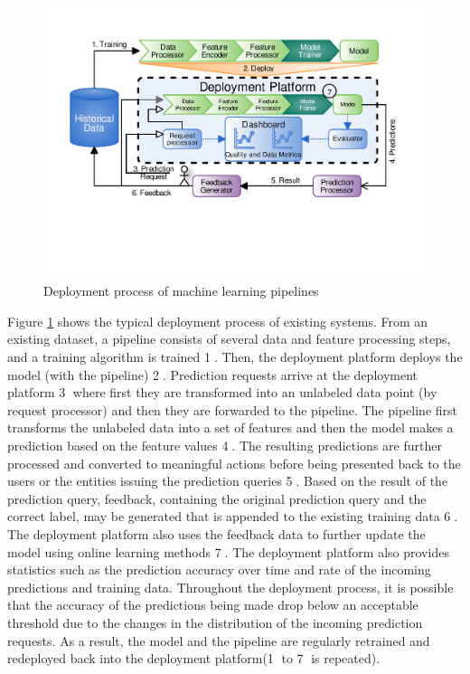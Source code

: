 \begin{figure}[h!]
\centering
\includegraphics[width=\columnwidth]{../images/generic-motivational-example.pdf}
\caption{Deployment process of machine learning pipelines}
\label{fig:motivational-example}
\end{figure}

Figure \ref{fig:motivational-example} shows the typical deployment process of existing systems.
From an existing dataset, a pipeline consists of several data and feature processing steps, and a training algorithm is trained \textcircled{1}.
Then, the deployment platform deploys the model (with the pipeline) \textcircled{2}.
Prediction requests arrive at the deployment platform \textcircled{3} where first they are transformed into an unlabeled data point (by request processor) and then they are forwarded to the pipeline.
The pipeline first transforms the unlabeled data into a set of features and then the model makes a prediction based on the feature values  \textcircled{4}.
The resulting predictions are further processed and converted to meaningful actions before being presented back to the users or the entities issuing the prediction queries \textcircled{5}.
Based on the result of the prediction query, feedback, containing the original prediction query and the correct label, may be generated that is appended to the existing training data \textcircled{6}.
The deployment platform also uses the feedback data to further update the model using online learning methods \textcircled{7}.
The deployment platform also provides statistics such as the prediction accuracy over time and rate of the incoming predictions and training data.
Throughout the deployment process, it is possible that the accuracy of the predictions being made drop below an acceptable threshold due to the changes in the distribution of the incoming prediction requests.
As a result, the model and the pipeline are regularly retrained and redeployed back into the deployment platform(\textcircled{1} to \textcircled{7} is repeated).

